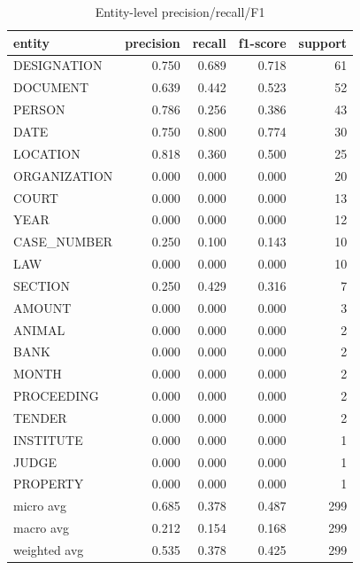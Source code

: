 \begin{table}
\caption{Entity-level precision/recall/F1}
\label{tab:ner_results}
\begin{tabular}{lrrrr}
\toprule
entity & precision & recall & f1-score & support \\
\midrule
DESIGNATION & 0.750 & 0.689 & 0.718 & 61 \\
DOCUMENT & 0.639 & 0.442 & 0.523 & 52 \\
PERSON & 0.786 & 0.256 & 0.386 & 43 \\
DATE & 0.750 & 0.800 & 0.774 & 30 \\
LOCATION & 0.818 & 0.360 & 0.500 & 25 \\
ORGANIZATION & 0.000 & 0.000 & 0.000 & 20 \\
COURT & 0.000 & 0.000 & 0.000 & 13 \\
YEAR & 0.000 & 0.000 & 0.000 & 12 \\
CASE\_NUMBER & 0.250 & 0.100 & 0.143 & 10 \\
LAW & 0.000 & 0.000 & 0.000 & 10 \\
SECTION & 0.250 & 0.429 & 0.316 & 7 \\
AMOUNT & 0.000 & 0.000 & 0.000 & 3 \\
ANIMAL & 0.000 & 0.000 & 0.000 & 2 \\
BANK & 0.000 & 0.000 & 0.000 & 2 \\
MONTH & 0.000 & 0.000 & 0.000 & 2 \\
PROCEEDING & 0.000 & 0.000 & 0.000 & 2 \\
TENDER & 0.000 & 0.000 & 0.000 & 2 \\
INSTITUTE & 0.000 & 0.000 & 0.000 & 1 \\
JUDGE & 0.000 & 0.000 & 0.000 & 1 \\
PROPERTY & 0.000 & 0.000 & 0.000 & 1 \\
micro avg & 0.685 & 0.378 & 0.487 & 299 \\
macro avg & 0.212 & 0.154 & 0.168 & 299 \\
weighted avg & 0.535 & 0.378 & 0.425 & 299 \\
\bottomrule
\end{tabular}
\end{table}
